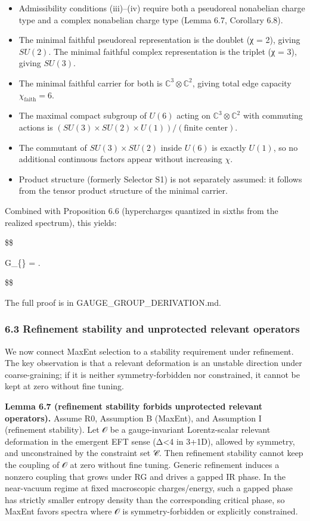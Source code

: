 \documentclass[11pt,a4paper]{article}
\theoremstyle{remark}
\providecommand{\tightlist}{%
  \setlength{\itemsep}{0pt}\setlength{\parskip}{0pt}}
\begin{document}
\begin{itemize}
\tightlist
\item
  Admissibility conditions (iii)--(iv) require both a pseudoreal nonabelian
  charge type and a complex nonabelian charge type (Lemma 6.7, Corollary 6.8).
\item
  The minimal faithful pseudoreal representation is the doublet (χ = 2),
  giving \(SU(2)\). The minimal faithful complex representation is the triplet
  (χ = 3), giving \(SU(3)\).
\item
  The minimal faithful carrier for both is \(\mathbb{C}^3 \otimes \mathbb{C}^2\),
  giving total edge capacity \(\chi_{\mathrm{faith}} = 6\).
\item
  The maximal compact subgroup of \(U(6)\) acting on
  \(\mathbb{C}^3 \otimes \mathbb{C}^2\) with commuting actions is
  \((SU(3) \times SU(2) \times U(1))/(\text{finite center})\).
\item
  The commutant of \(SU(3) \times SU(2)\) inside \(U(6)\) is exactly \(U(1)\),
  so no additional continuous factors appear without increasing \(\chi\).
\item
  Product structure (formerly Selector S1) is not separately assumed: it
  follows from the tensor product structure of the minimal carrier.
\end{itemize}

Combined with Proposition 6.6 (hypercharges quantized in sixths from the
realized spectrum), this yields:

\$\$

G\_\{\} = .

\$\$

The full proof is in GAUGE\_GROUP\_DERIVATION.md.

\subsubsection{6.3 Refinement stability and unprotected relevant operators}\label{refinement-stability-and-unprotected-relevant-operators}

We now connect MaxEnt selection to a stability requirement under refinement.
The key observation is that a relevant deformation is an unstable direction
under coarse-graining; if it is neither symmetry-forbidden nor constrained, it
cannot be kept at zero without fine tuning.

\textbf{Lemma 6.7 (refinement stability forbids unprotected relevant operators).}
Assume R0, Assumption B (MaxEnt), and Assumption I (refinement stability).
Let 𝒪 be a gauge-invariant Lorentz-scalar relevant deformation
in the emergent EFT sense (Δ\textless4 in 3+1D), allowed by symmetry,
and unconstrained by the constraint set 𝒞. Then refinement stability
cannot keep the coupling of 𝒪 at zero without fine tuning.
Generic refinement induces a nonzero coupling that grows under RG and
drives a gapped IR phase. In the near-vacuum regime at fixed macroscopic
charges/energy, such a gapped phase has strictly smaller entropy density
than the corresponding critical phase, so MaxEnt favors spectra where
𝒪 is symmetry-forbidden or explicitly constrained.
\end{document}
